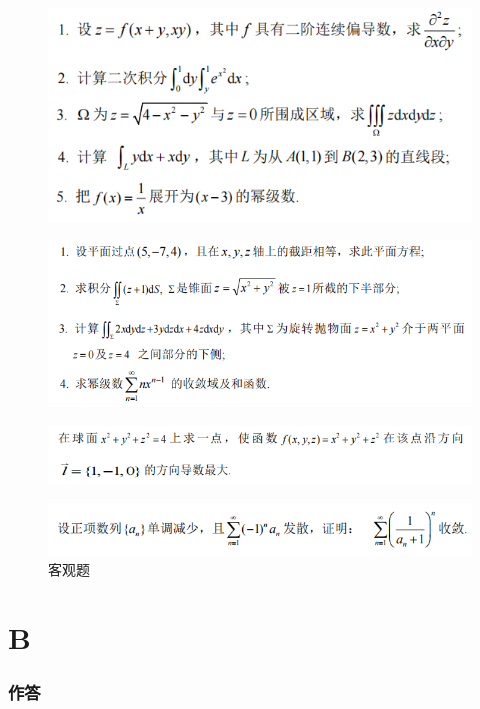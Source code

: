 \documentclass[a4paper,12pt]{ctexrep}
\begin{document}
\begin{figure}[H]
	\centering
	\includegraphics[width=1\textwidth]{20250526/4.png} 
\end{figure}
\begin{figure}[H]
	\centering
	\includegraphics[width=1\textwidth]{20250526/5.png} 
\end{figure}
\begin{figure}[H]
	\centering
	\includegraphics[width=1\textwidth]{20250526/6.png} 
\end{figure}
\begin{figure}[H]
	\centering
	\includegraphics[width=1\textwidth]{20250526/7.png} 
	\caption{客观题} 
\end{figure}

\newpage
\part{B}
\section{作答}
\end{document}
